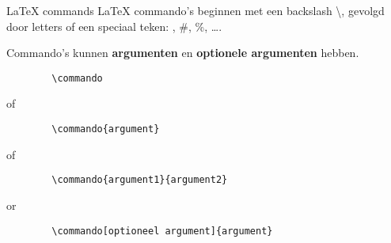 \begin{frame}[fragile]{LaTeX commands}
    LaTeX commando's beginnen met een backslash \textbackslash, gevolgd door letters of een speciaal teken: \@, \#, \%, \ldots.

    Commando's kunnen \textbf{argumenten} en \textbf{optionele argumenten} hebben.

    \begin{verbatim}
        \commando
    \end{verbatim}
    of
    \begin{verbatim}
        \commando{argument}
    \end{verbatim}
    of
    \begin{verbatim}
        \commando{argument1}{argument2}
    \end{verbatim}
    or
    \begin{verbatim}
        \commando[optioneel argument]{argument}
    \end{verbatim}

\end{frame}